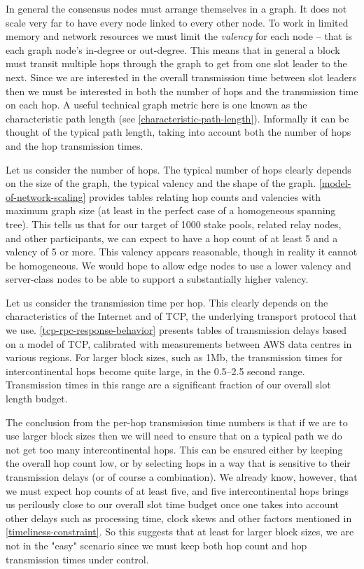 \documentclass[11pt,a4paper]{article}
\begin{document}
In general the consensus nodes must arrange themselves in a graph. It
does not scale very far to have every node linked to every other node.
To work in limited memory and network resources we must limit the
\emph{valency} for each node -- that is each graph node's in-degree or
out-degree. This means that in general a block must transit multiple
hops through the graph to get from one slot leader to the next. Since we
are interested in the overall transmission time between slot leaders
then we must be interested in both the number of hops and the
transmission time on each hop. A useful technical graph metric here is
one known as the characteristic path length (see
\cref{characteristic-path-length}). Informally it can be thought of the
typical path length, taking into account both the number of hops and
the hop transmission times.

Let us consider the number of hops. The typical number of hops clearly
depends on the size of the graph, the typical valency and the shape of
the graph. \cref{model-of-network-scaling}
provides tables relating hop counts and valencies with maximum graph
size (at least in the perfect case of a homogeneous spanning tree). This
tells us that for our target of 1000 stake pools, related relay nodes,
and other participants, we can expect to have a hop count of at least 5
and a valency of 5 or more. This valency appears reasonable, though in
reality it cannot be homogeneous. We would hope to allow edge nodes to
use a lower valency and server-class nodes to be able to support a
substantially higher valency.

Let us consider the transmission time per hop. This clearly depends on
the characteristics of the Internet and of TCP, the underlying transport
protocol that we use.
\cref{tcp-rpc-response-behavior} presents
tables of transmission delays based on a model of TCP, calibrated with
measurements between AWS data centres in various regions. For larger
block sizes, such as 1Mb, the transmission times for intercontinental
hops become quite large, in the 0.5--2.5 second range. Transmission
times in this range are a significant fraction of our overall slot
length budget.

The conclusion from the per-hop transmission time numbers is that if we
are to use larger block sizes then we will need to ensure that on a
typical path we do not get too many intercontinental hops. This can be
ensured either by keeping the overall hop count low, or by selecting
hops in a way that is sensitive to their transmission delays (or of
course a combination). We already know, however, that we must expect hop
counts of at least five, and five intercontinental hops brings us
perilously close to our overall slot time budget once one takes into
account other delays such as processing time, clock skews and other
factors mentioned in \cref{timeliness-constraint}. So this suggests that at least for larger block sizes, we are
not in the "easy" scenario since we must keep both hop count and hop
transmission times under control.
\end{document}
